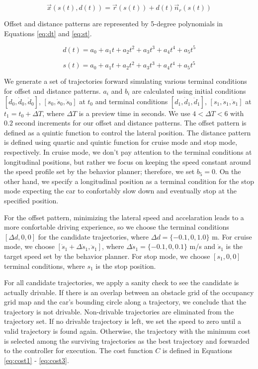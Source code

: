 \begin{equation}
    \vec{x}(s(t), d(t)) = \vec{r}(s(t)) + d(t)\vec{n}_r(s(t))
\label{eq:trajectory}
\end{equation}

Offset and distance patterns are represented by 5-degree polynomials
in Equations \eqref{eq:dt} and \eqref{eq:st}.

\begin{equation}
    d(t) = a_0 + a_1t + a_2t^2 + a_3t^3 + a_4t^4 + a_5t^5
\label{eq:dt}
\end{equation}

\begin{equation}
    s(t) = a_0 + a_1t + a_2t^2 + a_3t^3 + a_4t^4 + a_5t^5
\label{eq:st}
\end{equation}

We generate a set of trajectories forward simulating various terminal
conditions for offset and distance patterns. $a_i$ and $b_i$ are calculated
using initial conditions $[d_0, \dot{d}_0, \ddot{d}_0]$, $[s_0, \dot{s}_0,
\ddot{s}_0]$ at $t_0$ and terminal conditions $[d_1, \dot{d}_1, \ddot{d}_1]$,
$[s_1, \dot{s}_1, \ddot{s}_1]$ at $t_1 = t_0 + \Delta T$, where $\Delta T$ is a
preview time in seconds. We use $4 < \Delta T < 6$ with $0.2$ second increments
for our offset and distance patterns. The offset pattern is defined as a
quintic function to control the lateral position.  The distance pattern is
defined using quartic and quintic function for cruise mode and stop mode,
respectively. In cruise mode, we don't pay attention to the terminal conditions
at longitudinal positions, but rather we focus on keeping the speed constant
around the speed profile set by the behavior planner; therefore, we set $b_5 =
0$. On the other hand, we specify a longitudinal position as a terminal
condition for the stop mode expecting the car to confortably slow down and
eventually stop at the specified position.

For the offset pattern, minimizing the lateral speed and accelaration leads to
a more confortable driving experience, so  we choose the terminal conditions
$[\Delta d, 0, 0]$ for the candidate trajectories, where $\Delta d = \{-0.1, 0,
1.0\}$ m. For cruise mode, we choose $[\dot{s}_1 + \Delta \dot{s}_1,
\ddot{s}_1]$, where $\Delta \dot{s}_1 = \{-0.1, 0, 0.1\}$ m/s and $\dot{s}_1$
is the target speed set by the behavior planner. For stop mode, we choose
$[s_1, 0, 0]$ terminal conditions, where $s_1$ is the stop position.

For all candidate trajectories, we apply a sanity check to see the candidate is
actually drivable. If there is an overlap between an obstacle grid of the
occupancy grid map and the car's bounding circle along a trajectory, we
conclude that the trajectory is not drivable. Non-drivable trajectories are
eliminated from the trajectory set. If no drivable trajectory is left, we set
the speed to zero until a valid trajectory is found again. Otherwise, the
trajectory with the minimum cost is selected among the surviving trajectories
as the best trajectory and forwarded to the controller for execution.
The cost function $C$ is defined in Equations \eqref{eq:cost1} -
\eqref{eq:cost3}.

